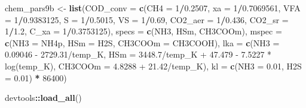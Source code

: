\documentclass[
]{article}
\newenvironment{Shaded}{\begin{snugshade}}{\end{snugshade}}
\newcommand{\AttributeTok}[1]{\textcolor[rgb]{0.13,0.29,0.53}{#1}}
\newcommand{\DecValTok}[1]{\textcolor[rgb]{0.00,0.00,0.81}{#1}}
\newcommand{\FloatTok}[1]{\textcolor[rgb]{0.00,0.00,0.81}{#1}}
\newcommand{\FunctionTok}[1]{\textcolor[rgb]{0.13,0.29,0.53}{\textbf{#1}}}
\newcommand{\NormalTok}[1]{#1}
\newcommand{\OtherTok}[1]{\textcolor[rgb]{0.56,0.35,0.01}{#1}}
\newcommand{\SpecialCharTok}[1]{\textcolor[rgb]{0.81,0.36,0.00}{\textbf{#1}}}
\newcommand{\StringTok}[1]{\textcolor[rgb]{0.31,0.60,0.02}{#1}}
\begin{document}
\begin{Shaded}
\begin{Highlighting}[]
\NormalTok{chem\_pars9b }\OtherTok{\textless{}{-}} \FunctionTok{list}\NormalTok{(}\AttributeTok{COD\_conv =} \FunctionTok{c}\NormalTok{(}\AttributeTok{CH4 =} \DecValTok{1}\SpecialCharTok{/}\FloatTok{0.2507}\NormalTok{, }\AttributeTok{xa =} \DecValTok{1}\SpecialCharTok{/}\FloatTok{0.7069561}\NormalTok{,}
                               \AttributeTok{VFA =} \DecValTok{1}\SpecialCharTok{/}\FloatTok{0.9383125}\NormalTok{, }\AttributeTok{S =} \DecValTok{1}\SpecialCharTok{/}\FloatTok{0.5015}\NormalTok{, }\AttributeTok{VS =} \DecValTok{1}\SpecialCharTok{/}\FloatTok{0.69}\NormalTok{, }
                               \AttributeTok{CO2\_aer =} \DecValTok{1}\SpecialCharTok{/}\FloatTok{0.436}\NormalTok{, }\AttributeTok{CO2\_sr =} \DecValTok{1}\SpecialCharTok{/}\FloatTok{1.2}\NormalTok{, }
                               \AttributeTok{C\_xa =} \DecValTok{1}\SpecialCharTok{/}\FloatTok{0.3753125}\NormalTok{),}
                   \AttributeTok{specs =} \FunctionTok{c}\NormalTok{(}\StringTok{\textquotesingle{}NH3\textquotesingle{}}\NormalTok{, }\StringTok{\textquotesingle{}HSm\textquotesingle{}}\NormalTok{, }\StringTok{\textquotesingle{}CH3COOm\textquotesingle{}}\NormalTok{),}
                   \AttributeTok{mspec =} \FunctionTok{c}\NormalTok{(}\AttributeTok{NH3 =} \StringTok{\textquotesingle{}NH4p\textquotesingle{}}\NormalTok{, }\AttributeTok{HSm =} \StringTok{\textquotesingle{}H2S\textquotesingle{}}\NormalTok{, }\AttributeTok{CH3COOm =} \StringTok{\textquotesingle{}CH3COOH\textquotesingle{}}\NormalTok{),}
                   \AttributeTok{lka =} \FunctionTok{c}\NormalTok{(}\AttributeTok{NH3 =} \StringTok{\textquotesingle{}{-} 0.09046 {-} 2729.31/temp\_K\textquotesingle{}}\NormalTok{, }
                           \AttributeTok{HSm =} \StringTok{\textquotesingle{}{-} 3448.7/temp\_K + 47.479 {-} 7.5227 * log(temp\_K)\textquotesingle{}}\NormalTok{,}
                           \AttributeTok{CH3COOm =} \StringTok{\textquotesingle{}{-}4.8288 + 21.42/temp\_K\textquotesingle{}}\NormalTok{),}
                   \AttributeTok{kl =} \FunctionTok{c}\NormalTok{(}\AttributeTok{NH3 =} \FloatTok{0.01}\NormalTok{, }\AttributeTok{H2S =} \FloatTok{0.01}\NormalTok{) }\SpecialCharTok{*} \DecValTok{86400}\NormalTok{)}
\end{Highlighting}
\end{Shaded}

\begin{Shaded}
\begin{Highlighting}[]
\NormalTok{devtools}\SpecialCharTok{::}\FunctionTok{load\_all}\NormalTok{()}
\end{Highlighting}
\end{Shaded}
\end{document}
